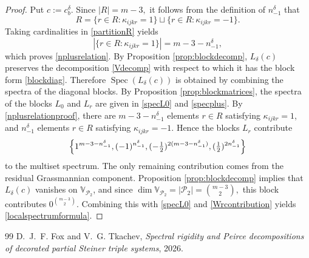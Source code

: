 \documentclass[10pt,a4paper]{amsart}
\numberwithin{equation}{section}
\def\valg{\mathbb{V}}
\DeclareMathOperator{\Spec}{Spec}
\begin{document}
\begin{proof}
Put $c:=c_b^\delta.$
Since $|R|=m-3,$
it follows from the definition of $n^{\delta}_{-1}$ that
\begin{equation}\label{partitionR}
R=
\{r\in R:\kappa_{ijkr}=1\}
\sqcup
\{r\in R:\kappa_{ijkr}=-1\}.
\end{equation}
Taking cardinalities in \eqref{partitionR} yields
\begin{equation}\label{nplusrelationproof}
|\{r\in R:\kappa_{ijkr}=1\}|
=
m-3-n^{\delta}_{-1},
\end{equation}
which proves \eqref{nplusrelation}.
By Proposition \ref{prop:blockdecomp}, $L_\delta(c)$ preserves the decomposition \eqref{Vdecomp} with respect to which it has the block form \eqref{blockdiag}.
Therefore
$\Spec(L_\delta(c))$
is obtained by combining the spectra of the diagonal blocks. By Proposition \ref{prop:blockmatrices}, the spectra of the blocks $L_0$ and $L_r$ are given in \eqref{specL0} and \eqref{specplus}.
By \eqref{nplusrelationproof}, there are $m-3-n^{\delta}_{-1}$ elements $r\in R$ satisfying $\kappa_{ijkr}=1$, and $n^{\delta}_{-1}$ elements $r\in R$ satisfying $\kappa_{ijkr}=-1$.
Hence the blocks $L_r$ contribute
\begin{equation}\label{Wrcontribution}
\Bigl\{
1^{m-3-n^{\delta}_{-1}},
(-1)^{n^{\delta}_{-1}},
(-\tfrac12)^{2(m-3-n^{\delta}_{-1})},
(\tfrac12)^{2n^{\delta}_{-1}}
\Bigr\}
\end{equation}
to the multiset spectrum.
The only remaining contribution comes from the residual Grassmannian component. Proposition \ref{prop:blockdecomp} implies that $L_\delta(c)$ vanishes on $\valg_{\mathcal{P}_2}$,
and since
$
\dim\valg_{\mathcal{P}_2}
=
|\mathcal{P}_2|
=
\binom{m-3}{2},
$
this block contributes $0^{\binom{m-3}{2}}.$ Combining this with \eqref{specL0} and \eqref{Wrcontribution} yields \eqref{localspectrumformula}.
\end{proof}

\begin{thebibliography}{99}
 D.~J.~F. Fox and V.~G. Tkachev, \emph{Spectral rigidity and {P}eirce decompositions of decorated partial {S}teiner triple systems}, 2026.
\end{thebibliography}
\end{document}
